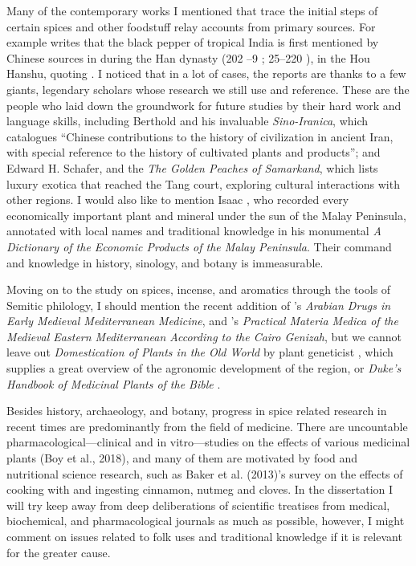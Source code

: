 
Many of the contemporary works I mentioned that trace the initial steps of certain spices and other foodstuff relay accounts from primary sources. For example \textcite{spengler_spices_2019} writes that the black pepper of tropical India is first mentioned by Chinese sources in during the Han dynasty (202 \BC{}--9 \AD{}; 25--220 \AD{}), in the \gls{Hou Hanshu}, quoting \textcite[374]{laufer_sino-iranica_1919}. I noticed that in a lot of cases, the reports are thanks to a few giants, legendary scholars whose research we still use and reference. These are the people who laid down the groundwork for future studies by their hard work and language skills, including Berthold \textcite{laufer_sino-iranica_1919} and his invaluable \textit{Sino-Iranica}, which catalogues ``Chinese contributions to the history of civilization in ancient Iran, with special reference to the history of cultivated plants and products''; and Edward H. Schafer, and the \textit{The Golden Peaches of Samarkand}, which lists luxury exotica that reached the Tang court, exploring cultural interactions with other regions. I would also like to mention Isaac \textcite{burkill_dictionary_1935}, who recorded every economically important plant and mineral under the sun of the Malay Peninsula, annotated with local names and traditional knowledge in his monumental \textit{A Dictionary of the Economic Products of the Malay Peninsula}. Their command and knowledge in history, sinology, and botany is immeasurable.

Moving on to the study on spices, incense, and aromatics through the tools of Semitic philology, I should mention the recent addition of \textcite{amar_arabian_2017}'s \textit{Arabian Drugs in Early Medieval Mediterranean Medicine}, and \textcite{lev_practical_2008}'s \textit{Practical Materia Medica of the Medieval Eastern Mediterranean According to the Cairo Genizah}, but we cannot leave out \textit{Domestication of Plants in the Old World} by plant geneticist \textcite{zohary_domestication_2012}, which supplies a great overview of the agronomic development of the region, or \textit{Duke's Handbook of Medicinal Plants of the Bible} \autocite{duke_dukes_2008}.

Besides history, archaeology, and botany, progress in spice related research in recent times are predominantly from the field of medicine. There are uncountable pharmacological---clinical and in vitro---studies on the effects of various medicinal plants (Boy et al., 2018), and many of them are motivated by food and nutritional science research, such as Baker et al. (2013)’s survey on the effects of cooking with and ingesting cinnamon, nutmeg and cloves. In the dissertation I will try keep away from deep deliberations of scientific treatises from medical, biochemical, and pharmacological journals as much as possible, however, I might  comment on issues related to folk uses and traditional knowledge if it is relevant for the greater cause.

